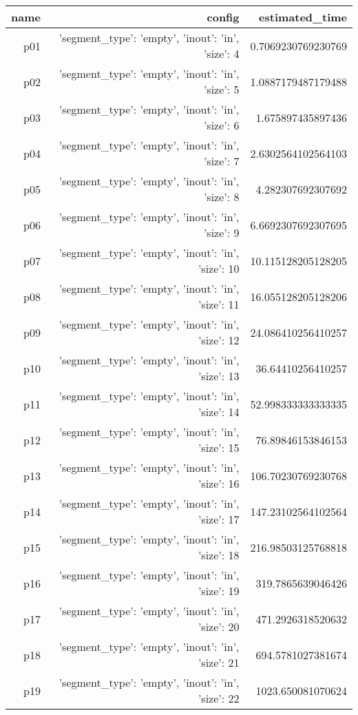 \documentclass{article}
\begin{document}
                            \begin{center}
                            \scriptsize
                            \begin{tabular}{r|r|r}
                            name & config & estimated\_time\\\midrule
                              p01&{'segment\_type': 'empty', 'inout': 'in', 'size': 4}&0.7069230769230769\\
  p02&{'segment\_type': 'empty', 'inout': 'in', 'size': 5}&1.0887179487179488\\
  p03&{'segment\_type': 'empty', 'inout': 'in', 'size': 6}&1.675897435897436\\
  p04&{'segment\_type': 'empty', 'inout': 'in', 'size': 7}&2.6302564102564103\\
  p05&{'segment\_type': 'empty', 'inout': 'in', 'size': 8}&4.282307692307692\\
  p06&{'segment\_type': 'empty', 'inout': 'in', 'size': 9}&6.6692307692307695\\
  p07&{'segment\_type': 'empty', 'inout': 'in', 'size': 10}&10.115128205128205\\
  p08&{'segment\_type': 'empty', 'inout': 'in', 'size': 11}&16.055128205128206\\
  p09&{'segment\_type': 'empty', 'inout': 'in', 'size': 12}&24.086410256410257\\
  p10&{'segment\_type': 'empty', 'inout': 'in', 'size': 13}&36.64410256410257\\
  p11&{'segment\_type': 'empty', 'inout': 'in', 'size': 14}&52.998333333333335\\
  p12&{'segment\_type': 'empty', 'inout': 'in', 'size': 15}&76.89846153846153\\
  p13&{'segment\_type': 'empty', 'inout': 'in', 'size': 16}&106.70230769230768\\
  p14&{'segment\_type': 'empty', 'inout': 'in', 'size': 17}&147.23102564102564\\
  p15&{'segment\_type': 'empty', 'inout': 'in', 'size': 18}&216.98503125768818\\
  p16&{'segment\_type': 'empty', 'inout': 'in', 'size': 19}&319.7865639046426\\
  p17&{'segment\_type': 'empty', 'inout': 'in', 'size': 20}&471.2926318520632\\
  p18&{'segment\_type': 'empty', 'inout': 'in', 'size': 21}&694.5781027381674\\
  p19&{'segment\_type': 'empty', 'inout': 'in', 'size': 22}&1023.650081070624\\

\end{tabular}
\end{center}
\end{document}
